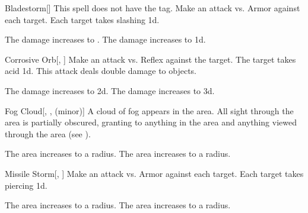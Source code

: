 \lowercase{\hypertarget{spell:Bladestorm}{}}\label{spell:Bladestorm}
\begin{freeability}[Rank 3]{\hypertarget{spell:Bladestorm}{Bladestorm}}[]
This spell does not have the  tag.
Make an attack vs. Armor against each target.
\hit Each target takes slashing  \minus1d.

\rankline
{} The damage increases to .
 The damage increases to  \plus1d.
\end{freeability}
\vspace{0.25em}



\lowercase{\hypertarget{spell:Corrosive Orb}{}}\label{spell:Corrosive Orb}
\begin{freeability}[Rank 3]{\hypertarget{spell:Corrosive Orb}{Corrosive Orb}}[, ]
Make an attack vs. Reflex against the target.
\hit The target takes acid  \plus1d.
This attack deals double damage to objects.

\rankline
{} The damage increases to  \plus2d.
 The damage increases to  \plus3d.
\end{freeability}
\vspace{0.25em}



\lowercase{\hypertarget{spell:Fog Cloud}{}}\label{spell:Fog Cloud}
\begin{freeability}[Rank 3]{\hypertarget{spell:Fog Cloud}{Fog Cloud}}[, ,  (minor)]
A cloud of fog appears in the area.
All sight through the area is partially obscured, granting  to anything in the area and anything viewed through the area (see ).

\rankline
{} The area increases to a \areamed radius.
 The area increases to a \arealarge radius.
\end{freeability}
\vspace{0.25em}



\lowercase{\hypertarget{spell:Missile Storm}{}}\label{spell:Missile Storm}
\begin{freeability}[Rank 3]{\hypertarget{spell:Missile Storm}{Missile Storm}}[, ]
Make an attack vs. Armor against each target.
\hit Each target takes piercing  \minus1d.

\rankline
{} The area increases to a \arealarge radius.
 The area increases to a \areahuge radius.
\end{freeability}
\vspace{0.25em}



